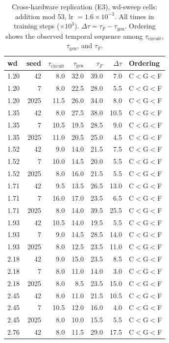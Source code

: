 \documentclass[12pt,openany,a4paper]{book}
\newcommand{\taug}{\tau_{\mathrm{gen}}}
\newcommand{\tauf}{\tau_{F}}
\newcommand{\taucirc}{\tau_{\mathrm{circuit}}}
\newcommand{\Dtau}{\Delta\tau}
\begin{document}
\begin{table}[htbp]
\centering
\caption{Cross-hardware replication (E3), wd-sweep cells: addition mod 53, lr $= 1.6\!\times\!10^{-3}$. All times in training steps ($\times 10^3$). $\Dtau = \tauf - \taug$. Ordering shows the observed temporal sequence among $\taucirc$, $\taug$, and $\tauf$.}
\label{tab:e3_wd}
\small
\begin{tabular}{lrrrrrl}
\toprule
wd & seed & $\taucirc$ & $\taug$ & $\tauf$ & $\Dtau$ & Ordering \\
\midrule
1.20 & 42   & 8.0  & 32.0 & 39.0 & 7.0   & C$<$G$<$F \\
1.20 & 7    & 8.0  & 22.5 & 28.0 & 5.5   & C$<$G$<$F \\
1.20 & 2025 & 11.5 & 26.0 & 34.0 & 8.0   & C$<$G$<$F \\
1.35 & 42   & 8.0  & 27.5 & 38.0 & 10.5  & C$<$G$<$F \\
1.35 & 7    & 10.5 & 19.5 & 28.5 & 9.0   & C$<$G$<$F \\
1.35 & 2025 & 11.0 & 20.5 & 25.0 & 4.5   & C$<$G$<$F \\
1.52 & 42   & 9.0  & 14.0 & 21.5 & 7.5   & C$<$G$<$F \\
1.52 & 7    & 10.0 & 14.5 & 20.0 & 5.5   & C$<$G$<$F \\
1.52 & 2025 & 8.0  & 16.0 & 21.5 & 5.5   & C$<$G$<$F \\
1.71 & 42   & 9.5  & 13.5 & 26.5 & 13.0  & C$<$G$<$F \\
1.71 & 7    & 16.0 & 17.0 & 23.5 & 6.5   & C$<$G$<$F \\
1.71 & 2025 & 8.0  & 14.0 & 39.5 & 25.5  & C$<$G$<$F \\
1.93 & 42   & 10.5 & 14.0 & 19.5 & 5.5   & C$<$G$<$F \\
1.93 & 7    & 9.0  & 14.5 & 28.5 & 14.0  & C$<$G$<$F \\
1.93 & 2025 & 8.0  & 12.5 & 23.5 & 11.0  & C$<$G$<$F \\
2.18 & 42   & 9.0  & 15.0 & 23.5 & 8.5   & C$<$G$<$F \\
2.18 & 7    & 8.0  & 11.0 & 14.0 & 3.0   & C$<$G$<$F \\
2.18 & 2025 & 8.0  & 8.5  & 23.5 & 15.0  & C$<$G$<$F \\
2.45 & 42   & 8.0  & 11.0 & 21.5 & 10.5  & C$<$G$<$F \\
2.45 & 7    & 10.5 & 12.0 & 16.0 & 4.0   & C$<$G$<$F \\
2.45 & 2025 & 8.0  & 10.0 & 15.5 & 5.5   & C$<$G$<$F \\
2.76 & 42   & 8.0  & 11.5 & 29.0 & 17.5  & C$<$G$<$F \\

\end{tabular}
\end{table}
\end{document}
